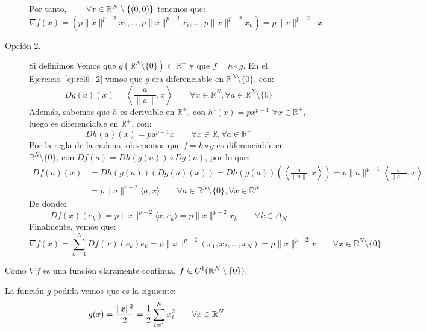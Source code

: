 \begin{ejercicio}
\begin{description}
        Por tanto, $\qquad \forall x\in \mathbb{R}^N\setminus \{(0,0)\}$ tenemos que:
        \begin{equation*}
            \nabla f(x) = \left(p\|x\|^{p-2}x_1,\dots, p\|x\|^{p-2}x_i, \dots, p\|x\|^{p-2}x_n\right) = p\|x\|^{p-2} \cdot x
        \end{equation*}
        \item [Opción 2.] Si definimos
            Vemos que $g(\mathbb{R}^N\setminus\{0\})\subset \mathbb{R}^+$ y que $f = h\circ g$. En el Ejercicio~\ref{ej:rel6_2} vimos que $g$ era diferenciable en $\mathbb{R}^N\setminus \{0\}$, con:
            \begin{equation*}
                Dg(a)(x) = \left\langle \dfrac{a}{\|a\|},x \right\rangle  \qquad \forall x\in \mathbb{R}^N, \forall a\in \mathbb{R}^N\setminus\{0\}
            \end{equation*}
            Además, sabemos que $h$ es derivable en $\mathbb{R}^+$, con $h'(x) = px^{p-1}$ $\forall x\in \mathbb{R}^+$, luego es diferenciable en $\mathbb{R}^+$, con:
            \begin{equation*}
                Dh(a)(x) = pa^{p-1}x \qquad \forall x\in \mathbb{R}, \forall a\in \mathbb{R}^+
            \end{equation*}
            Por la regla de la cadena, obtenemos que $f = h\circ g$ es diferenciable en $\mathbb{R}^N\setminus\{0\}$, con $Df(a) = Dh(g(a)) \circ Dg(a)$, por lo que:
            \begin{align*}
                Df(a)(x) &= Dh(g(a))(Dg(a)(x)) = Dh(g(a))\left(\left\langle \frac{a}{\|a\|},x \right\rangle \right) = p\|a\|^{p-1}\left\langle \frac{a}{\|a\|},x \right\rangle  \\
                         &= p\|a\|^{p-2}\langle a,x \rangle  \qquad \forall a\in \mathbb{R}^N\setminus\{0\}, \forall x\in \mathbb{R}^N
            \end{align*}
            De donde:
            \begin{equation*}
                Df(x)(e_k) = p\|x\|^{p-2}\langle x,e_k \rangle  = p\|x\|^{p-2}x_k \qquad \forall k\in \Delta_N
            \end{equation*}
            Finalmente, vemos que:
            \begin{equation*}
                \nabla f(x) = \sum_{k=1}^{N}Df(x)(e_k)e_k = p\|x\|^{p-2}(x_1,x_2,\ldots,x_N) = p\|x\|^{p-2}x \qquad \forall x\in \mathbb{R}^N\setminus\{0\}
            \end{equation*}
    \end{description}

    \noindent
    Como $\nabla f$ es una función claramente continua, $f\in C^1(\mathbb{R}^N\setminus \{0\})$.

    La función $g$ pedida vemos que es la siguiente:
    \begin{equation*}
        g(x) = \frac{\|x\|^2}{2} = \frac{1}{2} \sum_{i=1}^N x_i^2 \qquad \forall x\in \mathbb{R}^N
    \end{equation*}
\end{ejercicio}

